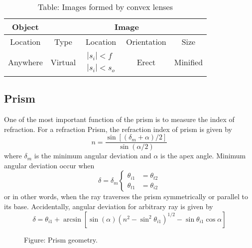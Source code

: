 \documentclass[../../../main.tex]{subfiles}
\begin{document}
\begin{table}
    \centering
    \caption*{Table: Images formed by convex lenses}
    \begin{tabular}{ccccc}
        \toprule
        Object & \multicolumn{4}{c}{Image}\\
        \midrule
        Location & Type & Location & Orientation & Size\\
        \midrule
        Anywhere &Virtual &$\begin{matrix}|s_i|<f \\|s_i|<s_o\end{matrix}$ &Erect &Minified \\
        \bottomrule
    \end{tabular}
\end{table}

\subsection{Prism}
One of the most important function of the prism is to measure the index of refraction. For a refraction Prism, the refraction index of prism is given by 
\begin{equation*}
    n=\frac{\sin [(\delta_m+\alpha)/2]}{\sin (\alpha/2)}
\end{equation*}
where $\delta_m$ is the minimum angular deviation and $\alpha$ is the apex angle. Minimum angular deviation occur when 
\begin{equation*}
    \delta=\delta_m\begin{cases}
        \theta_{i1}&=\theta_{t2}\\
        \theta_{t1}&=\theta_{i2}
    \end{cases}
\end{equation*}
or in other words, when the ray traverses the prism symmetrically or parallel to its base. Accidentally, angular deviation for arbitrary ray is given by 
\begin{equation*}
    \delta=\theta_{i1}+\arcsin\left[ \sin (\alpha)\left(n^2-\sin^2\theta_{i1}\right)^{1/2}-\sin\theta_{i1}\cos\alpha\right]
\end{equation*}

\begin{figure}
    \centering
    \caption*{Figure: Prism geometry.}
\end{figure}
\end{document}
